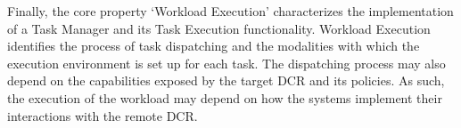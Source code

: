 \documentclass{sig-alternate}
\begin{document}
Finally, the core property `Workload Execution' characterizes the implementation
of a Task Manager and its Task Execution functionality. Workload Execution
identifies the process of task dispatching and the modalities with which the
execution environment is set up for each task. The dispatching process may also
depend on the capabilities exposed by the target DCR and its policies. As such,
the execution of the workload may depend on how the \pilot systems implement
their interactions with the remote DCR.


 
\end{document}
